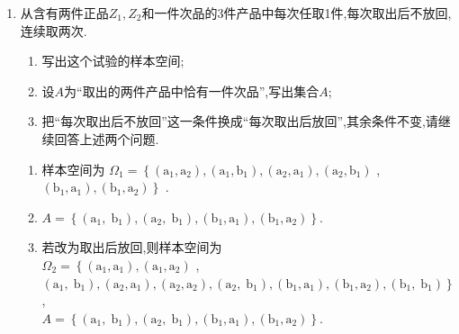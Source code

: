\begin{enumerate}
\item 从含有两件正品$Z_{1},Z_{2}$和一件次品的3件产品中每次任取1件,每次取出后不放回,连续取两次.
\begin{enumerate}
\item 写出这个试验的样本空间;
\item 设$A$为“取出的两件产品中恰有一件次品”,写出集合$A$;
\item 把“每次取出后不放回”这一条件换成“每次取出后放回”,其余条件不变,请继续回答上述两个问题.
\end{enumerate}

\begin{jieda}
    \begin{enumerate}
        \item 样本空间为 ${\Omega }_{1} = \left\{  {\left( {{\mathrm{a}}_{1},{\mathrm{a}}_{2}}\right) ,\left( {{\mathrm{a}}_{1},{\mathrm{b}}_{1}}\right) ,\left( {{\mathrm{a}}_{2},{\mathrm{a}}_{1}}\right) ,\left( {{\mathrm{a}}_{2},{\mathrm{b}}_{1}}\right) }\right.$ ,
$\left. {\left( {{\mathrm{b}}_{1},{\mathrm{a}}_{1}}\right) ,\left( {{\mathrm{b}}_{1},{\mathrm{a}}_{2}}\right) }\right\}$ .
        \item  $A = \left\{  {\left( {{\mathrm{a}}_{1},{\mathrm{\;b}}_{1}}\right) ,\left( {{\mathrm{a}}_{2},{\mathrm{\;b}}_{1}}\right) ,\left( {{\mathrm{b}}_{1},{\mathrm{a}}_{1}}\right) ,\left( {{\mathrm{b}}_{1},{\mathrm{a}}_{2}}\right) }\right\}  .$
        
        \item 若改为取出后放回,则样本空间为 \\
        ${\Omega }_{2} = \left\{  {\left( {{\mathrm{a}}_{1},{\mathrm{a}}_{1}}\right) ,\left( {{\mathrm{a}}_{1},{\mathrm{a}}_{2}}\right) }\right.$ ,
$\left. {\left( {{\mathrm{a}}_{1},{\mathrm{\;b}}_{1}}\right) ,\left( {{\mathrm{a}}_{2},{\mathrm{a}}_{1}}\right) ,\left( {{\mathrm{a}}_{2},{\mathrm{a}}_{2}}\right) ,\left( {{\mathrm{a}}_{2},{\mathrm{\;b}}_{1}}\right) ,\left( {{\mathrm{b}}_{1},{\mathrm{a}}_{1}}\right) ,\left( {{\mathrm{b}}_{1},{\mathrm{a}}_{2}}\right) ,\left( {{\mathrm{b}}_{1},{\mathrm{\;b}}_{1}}\right) }\right\}$ ,\\
$A = \left\{  {\left( {{\mathrm{a}}_{1},{\mathrm{\;b}}_{1}}\right) ,\left( {{\mathrm{a}}_{2},{\mathrm{\;b}}_{1}}\right) ,\left( {{\mathrm{b}}_{1},{\mathrm{a}}_{1}}\right) ,\left( {{\mathrm{b}}_{1},{\mathrm{a}}_{2}}\right) }\right\}  .$
    \end{enumerate}
\end{jieda}


\end{enumerate}
